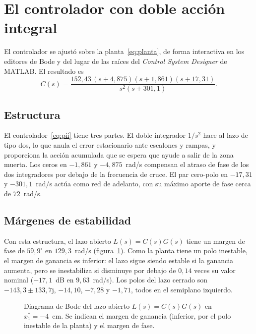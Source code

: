 \section{El controlador con doble acción integral}\label{sec:pii}

El controlador se ajustó sobre la planta~\eqref{eq:planta}, de forma interactiva en los editores de Bode y del lugar de las raíces del \emph{Control System Designer} de MATLAB. El resultado es
\begin{equation}
C(s)=\frac{152{,}43\,(s+4{,}875)(s+1{,}861)(s+17{,}31)}
{s^{2}(s+301{,}1)} .
\label{eq:pii}
\end{equation}

\subsection{Estructura}

El controlador~\eqref{eq:pii} tiene tres partes. El doble integrador $1/s^2$ hace al lazo de tipo dos, lo que anula el error estacionario ante escalones y rampas, y proporciona la acción acumulada que se espera que ayude a salir de la zona muerta. Los ceros en $-1{,}861$ y $-4{,}875$~rad/s compensan el atraso de fase de los dos integradores por debajo de la frecuencia de cruce. El par cero-polo en $-17{,}31$ y $-301{,}1$~rad/s actúa como red de adelanto, con su máximo aporte de fase cerca de $72$~rad/s.

\subsection{Márgenes de estabilidad}

Con esta estructura, el lazo abierto $L(s)=C(s)G(s)$ tiene un margen de fase de $59{,}9^\circ$ en $129{,}3$~rad/s (figura~\ref{bode_fase}). Como la planta tiene un polo inestable, el margen de ganancia es inferior: el lazo sigue siendo estable si la ganancia aumenta, pero se inestabiliza si disminuye por debajo de $0{,}14$ veces su valor nominal ($-17{,}1$~dB en $9{,}63$~rad/s). Los polos del lazo cerrado son $-143{,}3\pm133{,}7\mathrm{j}$, $-14{,}10$, $-7{,}28$ y $-1{,}71$, todos en el semiplano izquierdo.

\begin{figure}[ht]
    \centering
    
    \caption[Diagrama de Bode]{Diagrama de Bode del lazo abierto $L(s)=C(s)G(s)$ en $x_1^*=-4$~cm. Se indican el margen de ganancia (inferior, por el polo inestable de la planta) y el margen de fase.}
    \label{bode_fase}
\end{figure}

